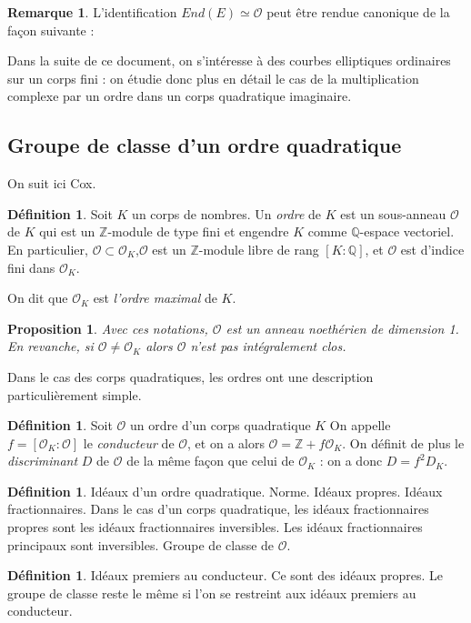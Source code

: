 \documentclass[11pt,a4paper]{article}
\newcommand{\Z}{\mathbb{Z}}
\newcommand{\Q}{\mathbb{Q}}
\renewcommand{\O}{\mathcal{O}}
\newtheorem{prop}[thm]{Proposition}
\theoremstyle{definition}
\newtheorem*{rem}{Remarque}
\newtheorem{defi}[thm]{Définition}
\begin{document}
\begin{rem}
L'identification $End(E)\simeq \O$ peut être rendue canonique de la façon suivante :
\end{rem}

Dans la suite de ce document, on s'intéresse à des courbes elliptiques ordinaires sur un corps fini : on étudie donc plus en détail le cas de la multiplication complexe par un ordre dans un corps quadratique imaginaire.

\subsection{Groupe de classe d'un ordre quadratique}

On suit ici Cox.

\begin{defi}
Soit $K$ un corps de nombres. Un \emph{ordre} de $K$ est un sous-anneau $\O$ de $K$ qui est un $\Z$-module de type fini et engendre $K$ comme $\Q$-espace vectoriel. En particulier, $\O\subset \O_K$,$\O$ est un $\Z$-module libre de rang $[K:\Q]$, et $\O$ est d'indice fini dans $\O_K$.

On dit que $\O_K$ est \emph{l'ordre maximal} de $K$.
\end{defi}

\begin{prop}
Avec ces notations, $\O$ est un anneau noethérien de dimension 1. En revanche, si $\O\neq \O_K$ alors $\O$ n'est pas intégralement clos.
\end{prop}

Dans le cas des corps quadratiques, les ordres ont une description particulièrement simple.

\begin{defi}
Soit $\O$ un ordre d'un corps quadratique $K$ On appelle $f=[\O_K:\O]$ le \emph{conducteur} de $\O$, et on a alors $\O=\Z+f \O_K$. On définit de plus le \emph{discriminant} $D$ de $\O$ de la même façon que celui de $\O_K$ : on a donc $D=f^2 D_K$.
\end{defi}

\begin{defi}
Idéaux d'un ordre quadratique. Norme. Idéaux propres. Idéaux fractionnaires. Dans le cas d'un corps quadratique, les idéaux fractionnaires propres sont les idéaux fractionnaires inversibles. Les idéaux fractionnaires principaux sont inversibles. Groupe de classe de $\O$.
\end{defi}

\begin{defi}
Idéaux premiers au conducteur. Ce sont des idéaux propres. Le groupe de classe reste le même si l'on se restreint aux idéaux premiers au conducteur.
\end{defi}
\end{document}
